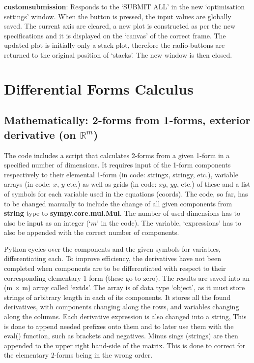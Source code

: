 \documentclass[12pt]{report}
\begin{document}
\textbf{custom\textunderscore submission}: Responds to the `SUBMIT ALL' in the new `optimisation settings' window. When the button is pressed, the input values are globally saved. The current axis are cleared, a new plot is constructed as per the new specifications and it is displayed on the `canvas' of the correct frame. The updated plot is initially only a stack plot, therefore the radio-buttons are returned to the original position of `stacks'. The new window is then closed.

\chapter{Differential Forms Calculus}

\section{Mathematically: 2-forms from 1-forms, exterior derivative (on $\mathbb{R}^{m}$)}
The code includes a script that calculates 2-forms from a given 1-form in a specified number of dimensions.
It requires input of the 1-form components respectively to their elemental 1-form (in code: string\textunderscore x, string\textunderscore y, etc.), variable arrays (in code: $x$, $y$ etc.) as well as grids (in code: $xg$, $yg$, etc.) of these and a list of symbols for each variable used in the equations (coords).
The code, so far, has to be changed manually to include the change of all given components from \textbf{string} type to \textbf{sympy.core.mul.Mul}. The number of used dimensions has to also be input as an integer (`$m$' in the code). The variable, `expressions' has to also be appended with the correct number of components.

\noindent Python cycles over the components and the given symbols for variables, differentiating each. To improve efficiency, the derivatives have not been completed when components are to be differentiated with respect to their corresponding elementary 1-form (these go to zero). The results are saved into an (m $\times$ m) array called `ext\textunderscore ds'. The array is of data type `object', as it must store strings of arbitrary length in each of its components. It stores all the found derivatives, with components changing along the rows, and variables changing along the columns.
Each derivative expression is also changed into a string, This is done to append needed prefixes onto them and to later use them with the eval() function, such as brackets and negatives. Minus sings (strings) are then appended to the upper right hand-side of the matrix. This is done to correct for the elementary 2-forms being in the wrong order.
\end{document}
